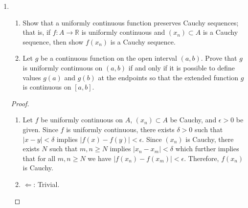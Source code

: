 \begin{enumerate}
    \item \begin{enumerate}
        \item Show that a uniformly continuous function preserves Cauchy sequences; that is, if \( f: A \rightarrow \mathbb{R} \) is uniformly continuous and \( (x_{n}) \subset A \) is a Cauchy sequence, then show \( f(x_{n}) \) is a Cauchy sequence.
        \item Let \( g \) be a continuous function on the open interval \( (a,b) \). Prove that \( g \) is uniformly continuous on \( (a,b) \) if and only if it is possible to define values \( g(a) \) and \( g(b) \) at the endpoints so that the extended function \( g \) is continuous on \([a,b] \).
    \end{enumerate}
    
    \begin{proof}
    \begin{enumerate}
        \item Let \( f \) be uniformly continuous on \( A \), \( (x_{n}) \subset A \) be Cauchy, and \( \epsilon > 0 \) be given. Since \( f \) is uniformly continuous, there exists \( \delta > 0 \) such that \( \vert x-y \vert < \delta \) implies \( \vert f(x) - f(y) \vert < \epsilon \). Since \( (x_{n}) \) is Cauchy, there exists \( N \) such that \( m,n \geq N \) implies \( \vert x_{n}-x_{m} \vert < \delta \) which further implies that for all \( m,n \geq N \) we have \( \vert f(x_{n}) - f(x_{m}) \vert < \epsilon \). Therefore, \( f(x_{n}) \) is Cauchy.
        
        \item \( \Leftarrow \): Trivial.
        

\end{enumerate}
\end{proof}
\end{enumerate}

